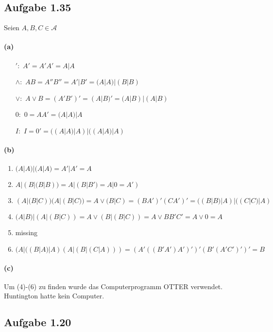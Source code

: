 \documentclass[10pt, a4paper]{article}
\begin{document}
\subsection{Aufgabe 1.35}
Seien $A,B,C \in \mathcal{A}$
\paragraph*{(a)}
\begin{itemize}
	\item[$':$] $A'=A'A'=A|A$
	\item[$\wedge:$] $AB=A''B''=A'|B'= (A|A)|(B|B)$
	\item[$\vee :$] $A\vee B=(A'B')'=(A|B)'=(A|B)|(A|B)$
	\item[$0:$] $0=AA'=(A|A)|A$
	\item[$I:$] $I=0'=((A|A)|A)|((A|A)|A)$
\end{itemize}


\paragraph*{(b)}
\begin{enumerate}
	\item $(A|A)|(A|A)=A'|A'=A$
	\item $A|(B|(B|B))=A|(B|B')=A|0=A')$
	\item $(A|(B|C))(A|(B|C))=A\vee (B|C)=(BA')'(CA')'=((B|B)|A)|((C|C)|A)$
	\item $(A|B)|(A|(B|C))=A\vee (B|(B|C))=A\vee BB'C'=A\vee 0=A $
	\item missing
	\item $(A|((B|A)|A)(A|(B|(C|A)))=(A'((B'A')A')')'(B'(A'C')')'=B$
\end{enumerate}

\paragraph*{(c)} Um (4)-(6) zu finden wurde das Computerprogramm OTTER verwendet. Huntington hatte kein Computer.

\subsection{Aufgabe 1.20}
\end{document}

